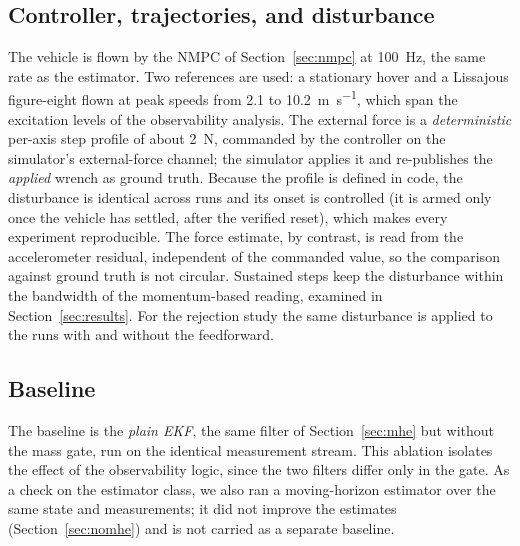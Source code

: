 \documentclass{ieeeaccess}
\begin{document}
\subsection{Controller, trajectories, and disturbance}
The vehicle is flown by the NMPC of Section~\ref{sec:nmpc} at \SI{100}{\hertz},
the same rate as the estimator. Two references are used: a
stationary hover and a Lissajous figure-eight flown at peak speeds from
\SI{2.1}{} to \SI{10.2}{\meter\per\second}, which span the excitation levels of
the observability analysis. The external force is a \emph{deterministic} per-axis
step profile of about \SI{2}{\newton}, commanded by the controller on the
simulator's external-force channel; the simulator applies it and re-publishes the
\emph{applied} wrench as ground truth. Because the profile is defined in code, the
disturbance is identical across runs and its onset is controlled (it is armed only
once the vehicle has settled, after the verified reset), which makes every
experiment reproducible. The force estimate, by contrast, is read from the
accelerometer residual, independent of the commanded value, so the comparison
against ground truth is not circular. Sustained steps keep the disturbance within
the bandwidth of the momentum-based reading, examined in
Section~\ref{sec:results}. For the rejection study the same disturbance is applied
to the runs with and without the feedforward.

\subsection{Baseline}
The baseline is the \emph{plain EKF}, the same filter of Section~\ref{sec:mhe}
but without the mass gate, run on the identical measurement stream. This
ablation isolates the effect of the observability logic, since the two filters
differ only in the gate. As a check on the estimator class, we also ran a
moving-horizon estimator over the same state and measurements; it did not improve
the estimates (Section~\ref{sec:nomhe}) and is not carried as a separate
baseline.
\end{document}
